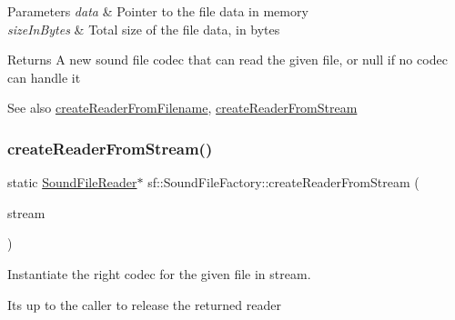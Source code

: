 \begin{DoxyParams}{Parameters}
{\em data} & Pointer to the file data in memory \\
\hline
{\em size\+In\+Bytes} & Total size of the file data, in bytes\\
\hline
\end{DoxyParams}
\begin{DoxyReturn}{Returns}
A new sound file codec that can read the given file, or null if no codec can handle it
\end{DoxyReturn}
\begin{DoxySeeAlso}{See also}
\mbox{\hyperlink{classsf_1_1_sound_file_factory_af0a87110e0b8a77aada17b22a016c066}{create\+Reader\+From\+Filename}}, \mbox{\hyperlink{classsf_1_1_sound_file_factory_a8d4b1f225b72a128ddba3be22f7ba5a2}{create\+Reader\+From\+Stream}} \begin{DoxyVerb}\end{DoxyVerb}
 
\end{DoxySeeAlso}
\mbox{\label{classsf_1_1_sound_file_factory_a8d4b1f225b72a128ddba3be22f7ba5a2}} 
\subsubsection{\texorpdfstring{createReaderFromStream()}{createReaderFromStream()}}
{\footnotesize\ttfamily static \mbox{\hyperlink{classsf_1_1_sound_file_reader}{Sound\+File\+Reader}}$\ast$ sf\+::\+Sound\+File\+Factory\+::create\+Reader\+From\+Stream (\begin{DoxyParamCaption}\item[{\mbox{\hyperlink{classsf_1_1_input_stream}{Input\+Stream}} \&}]{stream }\end{DoxyParamCaption})\hspace{0.3cm}{\ttfamily [static]}}



Instantiate the right codec for the given file in stream. 

It\textquotesingle{}s up to the caller to release the returned reader


